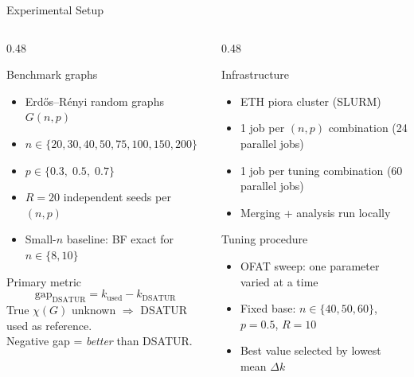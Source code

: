\documentclass[aspectratio=169,10pt]{beamer}
\newcommand{\kused}{k_{\text{used}}}
\newcommand{\gap}{\Delta k}
\begin{document}
\begin{frame}{Experimental Setup}

\begin{columns}[T]
\begin{column}{0.48\textwidth}
\begin{block}{Benchmark graphs}
\begin{itemize}
  \item Erdős–Rényi random graphs $G(n,p)$
  \item $n \in \{20, 30, 40, 50, 75, 100, 150, 200\}$
  \item $p \in \{0.3,\; 0.5,\; 0.7\}$
  \item $R = 20$ independent seeds per $(n, p)$
  \item Small-$n$ baseline: BF exact for $n \in \{8, 10\}$
\end{itemize}
\end{block}

\vspace{0.5em}
\begin{block}{Primary metric}
\[
  \text{gap}_{\text{DSATUR}} = \kused - k_{\text{DSATUR}}
\]
True $\chi(G)$ unknown $\Rightarrow$ DSATUR used as reference.\\
Negative gap = \emph{better} than DSATUR.
\end{block}
\end{column}

\begin{column}{0.48\textwidth}
\begin{block}{Infrastructure}
\begin{itemize}
  \item ETH piora cluster (SLURM)
  \item 1 job per $(n, p)$ combination (24 parallel jobs)
  \item 1 job per tuning combination (60 parallel jobs)
  \item Merging + analysis run locally
\end{itemize}
\end{block}

\vspace{0.5em}
\begin{block}{Tuning procedure}
\begin{itemize}
  \item OFAT sweep: one parameter varied at a time
  \item Fixed base: $n \in \{40,50,60\}$, $p=0.5$, $R=10$
  \item Best value selected by lowest mean $\gap$
\end{itemize}
\end{block}
\end{column}
\end{columns}

\end{frame}
\end{document}
